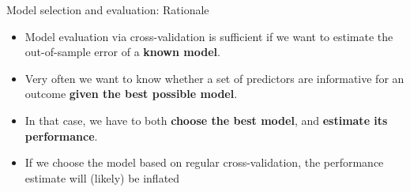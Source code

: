 \documentclass[10pt]{beamer}
\begin{document}
    \begin{frame}[t]{Model selection and evaluation: Rationale}
        \vspace{1cm}
        \begin{itemize}
            \item Model evaluation via cross-validation is sufficient if we want to estimate the out-of-sample error of a \textbf{known model}.
            \item Very often we want to know whether a set of predictors are informative for an outcome \textbf{given the best possible model}.
            \item In that case, we have to both \textbf{choose the best model}, and \textbf{estimate its performance}.
            \item If we choose the model based on regular cross-validation, the performance estimate will (likely) be inflated
         \end{itemize}
    \end{frame}
\end{document}
